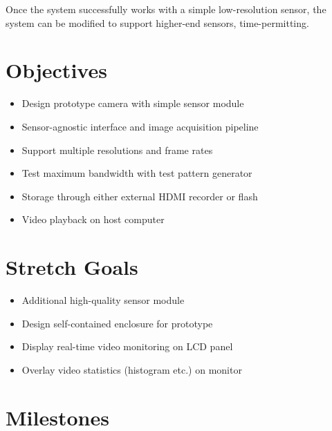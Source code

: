 \documentclass[a4paper]{article}
\begin{document}
Once the system successfully works with a simple low-resolution sensor, the system can be modified to support higher-end sensors, time-permitting.

\section{Objectives}

\begin{itemize}
    \item Design prototype camera with simple sensor module
    \item Sensor-agnostic interface and image acquisition pipeline
    \item Support multiple resolutions and frame rates
    \item Test maximum bandwidth with test pattern generator
    \item Storage through either external HDMI recorder or flash
    \item Video playback on host computer
\end{itemize}

\section{Stretch Goals}

\begin{itemize}
    \item Additional high-quality sensor module
    \item Design self-contained enclosure for prototype
    \item Display real-time video monitoring on LCD panel
    \item Overlay video statistics (histogram etc.) on monitor
\end{itemize}

\section{Milestones}
\end{document}
